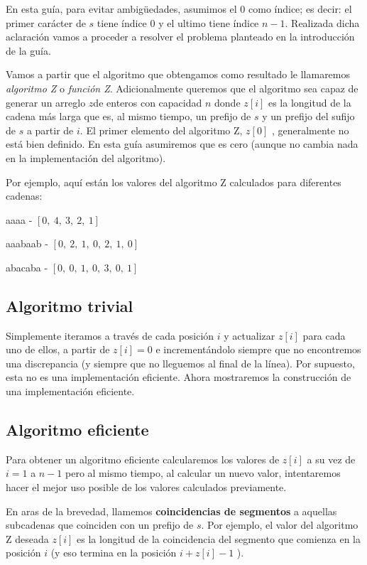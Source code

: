  En esta guía, para evitar ambigüedades, asumimos el 0 como índice; es decir: el primer carácter de $s$ tiene índice $0$ y el ultimo tiene índice $n-1$. Realizada dicha aclaración vamos a proceder a resolver el problema planteado en la introducción  de la guía.
 
 Vamos a partir que el algoritmo que obtengamos como resultado le llamaremos \emph{algoritmo Z} o \emph{función Z}. Adicionalmente queremos que el  algoritmo sea capaz de generar un arreglo $z$de enteros con capacidad $n$ donde $z[i]$ es la longitud de la cadena más larga que es, al mismo tiempo, un prefijo de $s$ y un prefijo del sufijo de $s$ a partir de $i$. El primer elemento del algoritmo Z, $z[0]$ , generalmente no está bien definido. En esta guía asumiremos que es cero (aunque no cambia nada en la implementación del algoritmo).

Por ejemplo, aquí están los valores del algoritmo Z calculados para diferentes cadenas:

aaaa - $[0,~4,~3,~2,~1]$

aaabaab - $[0,~2,~1,~0,~2,~1,~0]$

abacaba - $[0,~0,~1,~0,~3,~0,~1]$

\subsection{Algoritmo trivial}

Simplemente iteramos a través de cada posición $i$ y actualizar $z[i]$ para cada uno de ellos, a partir de $z[i] = 0$ e incrementándolo siempre que no
encontremos una discrepancia (y siempre que no lleguemos al final de la línea).
Por supuesto, esta no es una implementación eficiente. Ahora mostraremos la construcción de una implementación eficiente.

\subsection{Algoritmo eficiente}

Para obtener un algoritmo eficiente calcularemos los valores de $z[i]$ a su vez de $i = 1$ a $n-1$ pero al mismo tiempo, al calcular un nuevo valor,
intentaremos hacer el mejor uso posible de los valores calculados previamente.


En aras de la brevedad, llamemos \textbf{coincidencias de segmentos} a aquellas subcadenas que coinciden con un prefijo de $s$. Por ejemplo, el valor del algoritmo Z deseada $z[i]$ es la longitud de la coincidencia del segmento que comienza en la posición $i$ (y eso termina en la posición $i+z[i]-1$ ).

